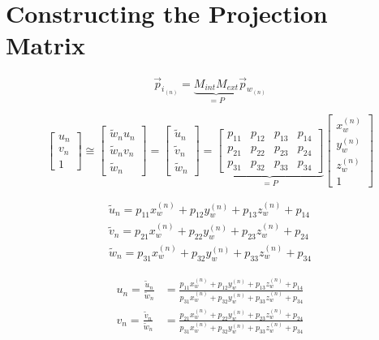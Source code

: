 \section{Constructing the Projection Matrix}
\begin{equation}
    \vec{p}_{i_{(n)}} = \underbrace{M_{int}M_{ext}}_{=P}\vec{p}_{w_{(n)}}
\end{equation}

\begin{equation}
    \begin{bmatrix}
        u_n \\ v_n \\ 1
    \end{bmatrix}
    \cong
    \begin{bmatrix}
        \widetilde{w}_n u_n \\ \widetilde{w}_n v_n \\ \widetilde{w}_n
    \end{bmatrix}
    =
    \begin{bmatrix}
        \widetilde{u}_n \\ \widetilde{v}_n \\ \widetilde{w}_n
    \end{bmatrix}
    =
    \underbrace{
        \begin{bmatrix}
            p_{11} & p_{12} & p_{13} & p_{14} \\
            p_{21} & p_{22} & p_{23} & p_{24} \\
            p_{31} & p_{32} & p_{33} & p_{34}
        \end{bmatrix}
    }_{=P}
    \begin{bmatrix}
        x_w^{(n)} \\ y_w^{(n)} \\ z_w^{(n)} \\ 1
    \end{bmatrix}
\end{equation}


\begin{align}
    \widetilde{u}_n = p_{11}x_w^{(n)} + p_{12}y_w^{(n)} + p_{13}z_w^{(n)} + p_{14} \\
    \widetilde{v}_n = p_{21}x_w^{(n)} + p_{22}y_w^{(n)} + p_{23}z_w^{(n)} + p_{24} \\
    \widetilde{w}_n = p_{31}x_w^{(n)} + p_{32}y_w^{(n)} + p_{33}z_w^{(n)} + p_{34}
\end{align}


\begin{align}
    u_n = \frac{\widetilde{u}_n}{\widetilde{w}_n} & = \frac{p_{11}x_w^{(n)} + p_{12}y_w^{(n)} + p_{13}z_w^{(n)} + p_{14}}{p_{31}x_w^{(n)} + p_{32}y_w^{(n)} + p_{33}z_w^{(n)} + p_{34}} \\
    v_n = \frac{\widetilde{v}_n}{\widetilde{w}_n} & = \frac{p_{21}x_w^{(n)} + p_{22}y_w^{(n)} + p_{23}z_w^{(n)} + p_{24}}{p_{31}x_w^{(n)} + p_{32}y_w^{(n)} + p_{33}z_w^{(n)} + p_{34}}
\end{align}

